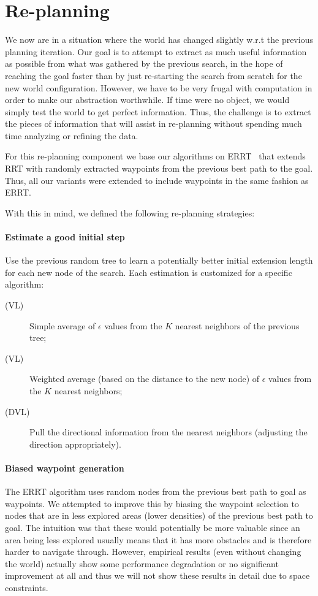 \documentclass[10pt,twoside,twocolumn]{article}
\begin{document}
\section{Re-planning}

We now are in a situation where the world has changed slightly w.r.t
the previous planning iteration. 
Our goal is to attempt to extract as much useful information as
possible from what was gathered by the previous 
search, in the hope of reaching the goal faster than by just re-starting
the search from scratch for the new world configuration.  However, we have to
be very frugal with computation in order to make our abstraction 
worthwhile.  If time were no object, we would simply test the world
to get perfect information.  Thus, the challenge is to extract the
pieces of information that will assist in re-planning without spending much time
analyzing or refining the data.

For this re-planning component we base our algorithms on
ERRT~\cite{Bruce02real-timerandomized} 
that extends RRT with randomly extracted waypoints from the previous
best path to the goal. Thus, all our variants were extended to include
waypoints in the same fashion as ERRT.

With this in mind, we defined the following re-planning strategies:
\paragraph{Estimate a good initial step} 
Use the previous random tree to
  learn a potentially better initial extension length for each new
  node of the search. 
  Each estimation is customized for a specific algorithm:
\begin{description}
\item[(VL)] Simple average of $\epsilon$ values from the $K$ nearest neighbors of the previous tree;
\item[(VL)] Weighted average (based on the distance to the new node) of $\epsilon$ values from the $K$ nearest neighbors; 
\item[(DVL)] Pull the directional information from the nearest neighbors (adjusting the direction appropriately).
\end{description}

\paragraph{Biased waypoint generation} 
The ERRT algorithm uses random
  nodes from the previous best path to goal as waypoints. 
  We attempted to improve this by biasing the waypoint selection to
  nodes that are in less explored areas (lower densities) of the previous best path to goal. 
  The intuition was that these would potentially be more valuable
  since an area being less explored usually means that it has more
  obstacles and is therefore harder to navigate through. 
  However, empirical results (even without changing the world) actually show
  some performance degradation or no significant improvement at all
  and thus we will not show these results in detail due to space constraints.
\end{document}
